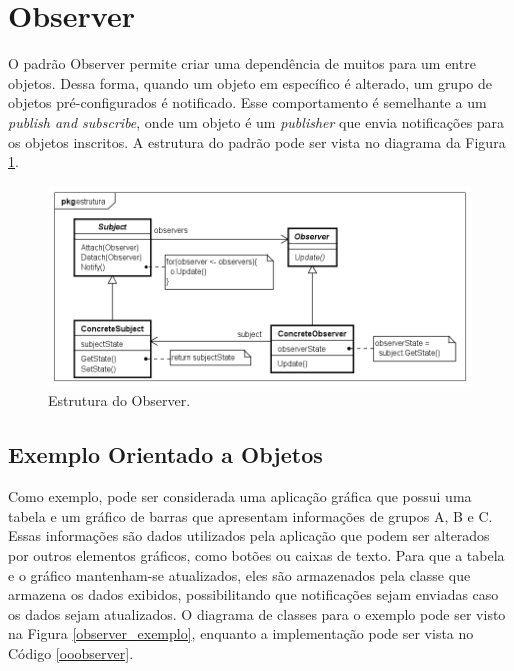 \section{Observer}

O padrão Observer permite criar uma dependência de muitos 
para um entre objetos. Dessa forma, quando um 
objeto em específico é alterado, um grupo de objetos 
pré-configurados é notificado. Esse comportamento é 
semelhante a um \textit{publish and subscribe}, onde 
um objeto é um \textit{publisher} que envia notificações 
para os objetos inscritos. A estrutura do padrão pode ser 
vista no diagrama da Figura \ref{observer_struct}.\cite{gamma:1995}

\begin{figure}[htb]
	\caption{\label{observer_struct}Estrutura do Observer.}
	\begin{center}
	    \includegraphics[scale=0.5]{5_padroes-contexto-funcional/5.3_comportamentais/5.3.07_observer/observer_estrutura.png}
	\end{center}
\end{figure}

\subsection*{Exemplo Orientado a Objetos}

Como exemplo, pode ser considerada uma aplicação 
gráfica que possui uma tabela e um gráfico de 
barras que apresentam informações de grupos 
A, B e C. Essas informações são dados utilizados 
pela aplicação que podem ser alterados por outros 
elementos gráficos, como botões ou caixas de texto. 
Para que a tabela e o gráfico mantenham-se atualizados, 
eles são armazenados pela classe que armazena 
os dados exibidos, possibilitando que 
notificações sejam enviadas 
caso os dados sejam atualizados. O diagrama 
de classes para o exemplo pode ser visto na Figura 
\ref{observer_exemplo}, enquanto a implementação 
pode ser vista no Código \ref{ooobserver}.

